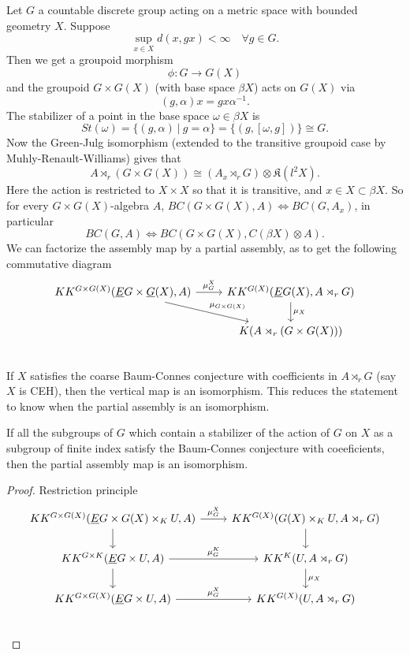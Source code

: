 Let $G$ a countable discrete group acting on a metric space with bounded geometry $X$. Suppose 
\[\sup_{x\in X} d(x,gx) <\infty \quad \forall g\in G.\]
Then we get a groupoid morphism
\[\phi : G \rightarrow G(X) \]
and the groupoid $G\times G(X)$ (with base space $\beta X$) acts on $G(X)$ via 
\[(g , \alpha)x = gx\alpha^{-1}.\]
The stabilizer of a point in the base space $\omega \in \beta X$ is 
\[St(\omega) = \{ (g,\alpha) \ | \ g= \alpha\} = \{(g , [\omega, g])\} \cong G.\]
Now the Green-Julg isomorphism (extended to the transitive groupoid case by Muhly-Renault-Williams) gives that 
\[ A\rtimes_r (G\times G(X)) \cong (A_x \rtimes_r G) \otimes \mathfrak K(l^2 X).\]
Here the action is restricted to $X\times X$ so that it is transitive, and $x\in X \subset \beta X$. So for every $G\times G(X)$-algebra $A$, $BC(G\times G(X) , A) \iff BC(G, A_x) $, in particular 
\[ BC(G, A ) \iff BC(G\times G(X) , C(\beta X)\otimes A).\]
We can factorize the assembly map by a partial assembly, as to get the following commutative diagram
\[\begin{tikzcd}
KK^{G\times G(X)}(\underline E G\times \underline G(X), A ) \arrow{dr}{\mu_{G\times G(X)}}\arrow{r}{\mu_G^X } 
		& KK^{G(X)}(\underline E G(X), A\rtimes_r G ) 	\arrow{d}{\mu_X}\\
		& K(A\rtimes_r (G\times G(X))) \\ 
\end{tikzcd}\]
If $X$ satisfies the coarse Baum-Connes conjecture with coefficients in $A\rtimes_r G$ (say $X$ is CEH), then the vertical map is an isomorphism. This reduces the statement to know when the partial assembly is an isomorphism. 

\begin{prop}
If all the subgroups of $G$ which contain a stabilizer of the action of $G$ on $X$ as a subgroup of finite index satisfy the Baum-Connes conjecture with coeeficients, then the partial assembly map is an isomorphism.
\end{prop} 

\begin{proof} Restriction principle
\[\begin{tikzcd}
KK^{G\times G(X)}(\underline E G\times G(X)\times_{K}U , A ) \arrow{d}{}\arrow{r}{\mu_G^X } 
		& KK^{G(X)}(G(X)\times_{K}U , A\rtimes_r G ) 	\arrow{d}{}\\
KK^{G\times K}(\underline E G\times U , A ) \arrow{d}{}\arrow{r}{\mu_G^K } 
		& KK^{K}(U , A\rtimes_r G ) 	\arrow{d}{\mu_X}\\
KK^{G\times G(X)}(\underline E G \times U , A )\arrow{r}{\mu_G^X } 
		& KK^{G(X)}(U , A\rtimes_r G ) \\
		\end{tikzcd}\]
\end{proof}

